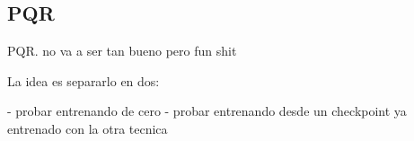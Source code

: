 
\subsection{PQR}

PQR. no va a ser tan bueno pero fun shit

La idea es separarlo en dos:

- probar entrenando de cero
- probar entrenando desde un checkpoint ya entrenado con la otra tecnica
